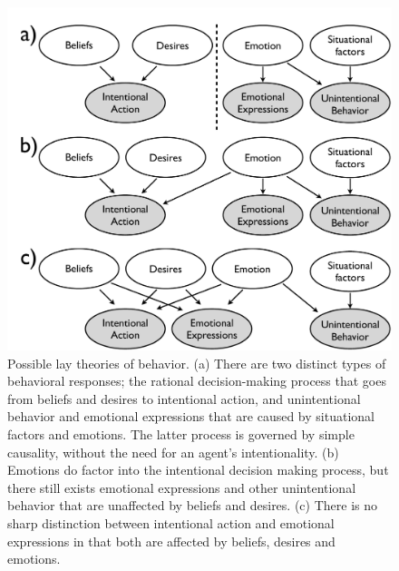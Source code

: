 \documentclass[10pt,letterpaper]{article}
\newcommand{\ndg}[1]{\textcolor{Green}{[ndg: #1]}}
\begin{document}
\begin{figure}[htb!]
\begin{center}
\includegraphics[width=1\columnwidth]{images/model1.pdf} 
\end{center}
\caption{ Possible lay theories of behavior. (a) There are two distinct types of behavioral responses; the rational decision-making process that goes from beliefs and desires to intentional action, and unintentional behavior and emotional expressions that are caused by situational factors and emotions. The latter process is governed by simple causality, without the need for an agent's intentionality. (b) Emotions do factor into the intentional decision making process, but there still exists emotional expressions and other unintentional behavior that are unaffected by beliefs and desires. (c) There is no sharp distinction between intentional action and emotional expressions in that both are affected by beliefs, desires and emotions.  }
\label{ModelsOfBehaviorFig}
\end{figure}


\end{document}
